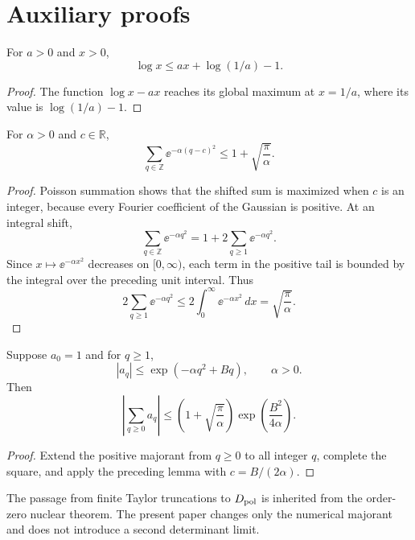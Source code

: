 \section{Auxiliary proofs}

\begin{lemma}
For \(a>0\) and \(x>0\),
\[
 \log x\le ax+\log(1/a)-1.
\]
\end{lemma}
\begin{proof}
The function \(\log x-ax\) reaches its global maximum at \(x=1/a\), where
its value is \(\log(1/a)-1\).
\end{proof}

\begin{lemma}
For \(\alpha>0\) and \(c\in\mathbb R\),
\[
 \sum_{q\in\mathbb Z}\ee^{-\alpha(q-c)^2}
 \le 1+\sqrt{\frac\pi\alpha}.
\]
\end{lemma}
\begin{proof}
Poisson summation shows that the shifted sum is maximized when \(c\) is an
integer, because every Fourier coefficient of the Gaussian is positive.
At an integral shift,
\[
 \sum_{q\in\mathbb Z}\ee^{-\alpha q^2}
 =1+2\sum_{q\ge1}\ee^{-\alpha q^2}.
\]
Since \(x\mapsto\ee^{-\alpha x^2}\) decreases on \([0,\infty)\), each term
in the positive tail is bounded by the integral over the preceding unit
interval.  Thus
\[
 2\sum_{q\ge1}\ee^{-\alpha q^2}
 \le2\int_0^\infty\ee^{-\alpha x^2}\,dx
 =\sqrt{\frac\pi\alpha}.
\]
\end{proof}

\begin{proposition}
Suppose \(a_0=1\) and for \(q\ge1\),
\[
 |a_q|\le\exp(-\alpha q^2+Bq),
 \qquad \alpha>0.
\]
Then
\[
 \left|\sum_{q\ge0}a_q\right|
 \le\left(1+\sqrt{\frac\pi\alpha}\right)
 \exp\left(\frac{B^2}{4\alpha}\right).
\]
\end{proposition}
\begin{proof}
Extend the positive majorant from \(q\ge0\) to all integer \(q\), complete
the square, and apply the preceding lemma with \(c=B/(2\alpha)\).
\end{proof}

The passage from finite Taylor truncations to \(D_{\mathrm{pol}}\) is inherited from the
order-zero nuclear theorem.  The present paper changes only the numerical
majorant and does not introduce a second determinant limit.

